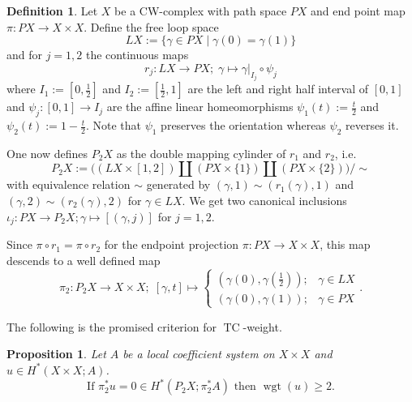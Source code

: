 \documentclass[a4paper,twoside]{article}
\theoremstyle{plain}
\newtheorem{proposition}[theorem]{Proposition}
\theoremstyle{definition}
\newtheorem{definition}[theorem]{Definition}
\theoremstyle{remark}
\newcommand{\disjointunion}{\amalg}
\DeclareMathOperator{\TC}{TC}
\DeclareMathOperator{\wgt}{wgt}
\begin{document}
\begin{definition}\label{def:LX_PX}
  Let $X$ be a CW-complex with path space $PX$ and end point map $\pi\colon
  PX\to X\times X$. Define the free loop space
\begin{equation*}
  LX:= \{\gamma\in PX \mid \gamma(0)=\gamma(1)\}
\end{equation*}
  and for $j=1,2$ the continuous maps
  \begin{equation}\label{eq:def_of_rj}
    r_j\colon LX\to PX; \;\gamma\mapsto \gamma|_{I_j}\circ \psi_j
  \end{equation}
  where $I_1:= [0,\frac{1}{2}]$ and $I_2:=[\frac{1}{2},1]$ are the left and
  right half interval of $[0,1]$ and $\psi_j\colon [0,1]\to I_j$ are the 
  affine linear homeomorphisms $\psi_1(t):=\frac{t}{2}$ and
  $\psi_2(t):=1-\frac{t}{2}$. Note that $\psi_1$ preserves the orientation
  whereas $\psi_2$ reverses it.

  One now defines $P_2X$ as the double mapping cylinder of $r_1$ and $r_2$, i.e.
  \begin{equation*}
    P_2X:= \big((LX\times [1,2])\disjointunion (PX\times \{1\}) \disjointunion (PX\times \{2\})\big)/\sim
  \end{equation*}
  with equivalence relation $\sim$ generated by $(\gamma,1)\sim
  (r_1(\gamma),1)$ and $(\gamma,2)\sim (r_2(\gamma),2)$ for $\gamma\in
  LX$. We get two canonical inclusions $\iota_j\colon PX\to P_2X;
  \gamma\mapsto [(\gamma,j)]$ for $j=1,2$.

  Since $\pi\circ r_1=\pi\circ r_2$ for the endpoint projection
  $\pi\colon PX\to X\times X$, this map descends to a well defined map
  \begin{equation*}
    \pi_2\colon P_2X\to X\times X; \; [\gamma,t]\mapsto
    \begin{cases}
      (\gamma(0),\gamma(\frac{1}{2})) ;& \gamma\in LX\\
      (\gamma(0),\gamma(1)); & \gamma\in PX
    \end{cases}
    .
  \end{equation*}

\end{definition}

The following \cite[Proposition 2.3]{GrantMescher} is the promised criterion for $\TC$-weight.
\begin{proposition}\label{prop:TC_crit}
  Let $A$ be a local coefficient system on $X\times X$ and $u\in H^*(X\times
  X; A)$. 
  \begin{equation*}
    \text{If }\pi_2^*u = 0 \in H^*(P_2X; \pi_2^*A)\text{ then }\wgt(u)\ge 2.
  \end{equation*}
\end{proposition}
\end{document}
